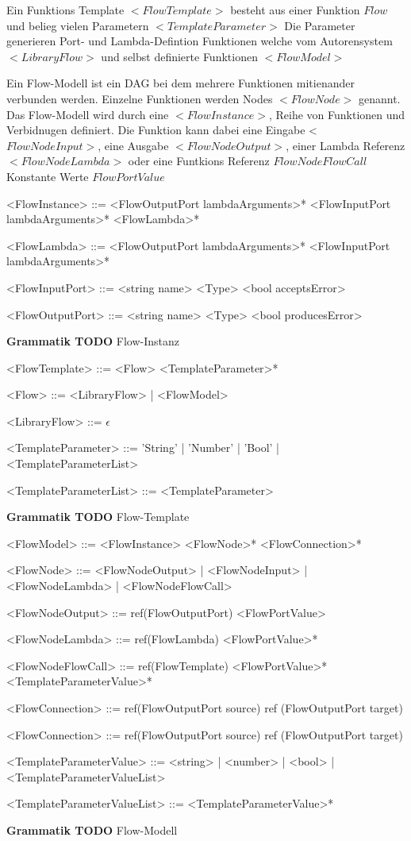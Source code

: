 \documentclass{article}
\begin{document}
    Ein Funktions Template $<FlowTemplate>$ besteht aus einer Funktion $Flow$ und belieg vielen Parametern $<TemplateParameter>$
    Die Parameter generieren Port- und Lambda-Defintion
    Funktionen welche vom Autorensystem $<LibraryFlow>$ und selbst definierte Funktionen $<FlowModel>$

    Ein Flow-Modell ist ein DAG bei dem mehrere Funktionen mitienander verbunden werden. Einzelne Funktionen werden Nodes $<FlowNode>$ genannt.
    Das Flow-Modell wird durch eine $<FlowInstance>$, Reihe von Funktionen und Verbidnugen definiert.
    Die Funktion kann dabei eine Eingabe <$FlowNodeInput>$, eine Ausgabe $<FlowNodeOutput>$, einer Lambda Referenz $<FlowNodeLambda>$ oder eine Funtkions Referenz $FlowNodeFlowCall$
    Konstante Werte $FlowPortValue$
    \begin{grammar}
        <FlowInstance> ::= <FlowOutputPort lambdaArguments>* <FlowInputPort lambdaArguments>* <FlowLambda>*
        
        <FlowLambda> ::= <FlowOutputPort lambdaArguments>* <FlowInputPort lambdaArguments>*

        <FlowInputPort> ::= <string name> <Type> <bool acceptsError>

        <FlowOutputPort> ::= <string name> <Type> <bool producesError>
    \end{grammar}
    \textbf{Grammatik TODO} Flow-Instanz
    \begin{grammar}
        <FlowTemplate> ::= <Flow> <TemplateParameter>*

        <Flow> ::= <LibraryFlow> | <FlowModel>
        
        <LibraryFlow> ::= $\epsilon$

        <TemplateParameter> ::= 'String' | 'Number' | 'Bool' | <TemplateParameterList>
        
        <TemplateParameterList> ::= <TemplateParameter>
    \end{grammar}
    \textbf{Grammatik TODO} Flow-Template
    \begin{grammar}
        <FlowModel> ::= <FlowInstance> <FlowNode>* <FlowConnection>*

        <FlowNode> ::= <FlowNodeOutput> | <FlowNodeInput> | <FlowNodeLambda> | <FlowNodeFlowCall>
       
        <FlowNodeOutput> ::= ref(FlowOutputPort) <FlowPortValue>

        <FlowNodeLambda> ::= ref(FlowLambda) <FlowPortValue>*

        <FlowNodeFlowCall> ::= ref(FlowTemplate) <FlowPortValue>* <TemplateParameterValue>*
    
        <FlowConnection> ::= ref(FlowOutputPort source) ref (FlowOutputPort target)
    
        <FlowConnection> ::= ref(FlowOutputPort source) ref (FlowOutputPort target)
    
        <TemplateParameterValue> ::= <string> | <number> | <bool> | <TemplateParameterValueList>
    
        <TemplateParameterValueList> ::= <TemplateParameterValue>*
    \end{grammar}
    \textbf{Grammatik TODO} Flow-Modell
    \newpage
\end{document}
